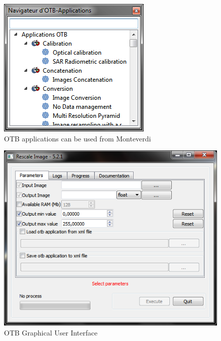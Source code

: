 \documentclass[10pt,a4paper]{article}
\begin{document}
\begin{figure}[h]
  \center
  \includegraphics[scale=1]{Art/windows-mapla.png}
  \caption[]{OTB applications can be used from Monteverdi}
  \label{fig:windows-mapla}
\end{figure}

\begin{figure}[h]
  \center
  \includegraphics[scale=1]{Art/windows-otbgui.png}
  \caption[]{OTB Graphical User Interface}
  \label{fig:windows-otbgui}
\end{figure}
\end{document}
